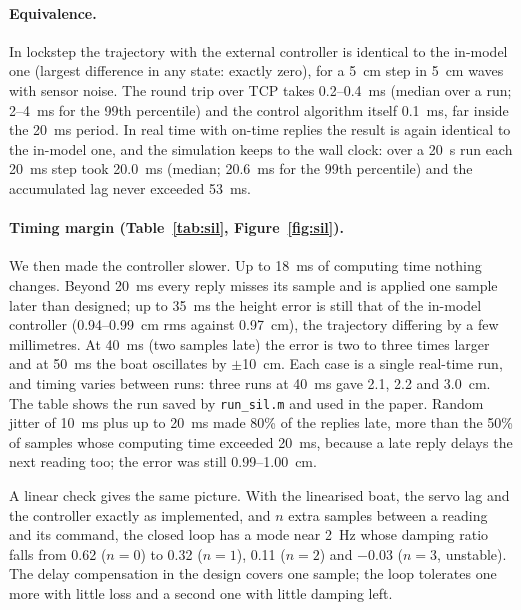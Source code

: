 \documentclass[11pt,a4paper]{article}
\begin{document}
\paragraph{Equivalence.} In lockstep the trajectory with the external controller
is identical to the in-model one (largest difference in any state: exactly
zero), for a \SI{5}{cm} step in \SI{5}{cm} waves with sensor noise. The round trip
over TCP takes 0.2--\SI{0.4}{ms} (median over a run; 2--\SI{4}{ms} for the 99th
percentile) and the
control algorithm itself \SI{0.1}{ms}, far inside the \SI{20}{ms} period. In real
time with on-time replies the result is again identical to the in-model one, and
the simulation keeps to the wall clock: over a \SI{20}{s} run each \SI{20}{ms}
step took \SI{20.0}{ms} (median; \SI{20.6}{ms} for the 99th percentile) and the
accumulated lag never exceeded \SI{53}{ms}.

\paragraph{Timing margin (Table~\ref{tab:sil}, Figure~\ref{fig:sil}).} We then
made the controller slower. Up to \SI{18}{ms} of computing time nothing changes.
Beyond \SI{20}{ms} every reply misses its sample and is applied one sample later
than designed; up to \SI{35}{ms} the height error is still that of the in-model
controller (0.94--\SI{0.99}{cm} rms against \SI{0.97}{cm}), the trajectory differing
by a few millimetres. At \SI{40}{ms} (two samples late) the error is two to three
times larger and at \SI{50}{ms} the boat oscillates by $\pm$\SI{10}{cm}. Each
case is a single real-time run, and timing varies between runs: three runs at
\SI{40}{ms} gave 2.1, 2.2 and \SI{3.0}{cm}. The table shows the run saved by
\texttt{run\_sil.m} and used in the paper. Random jitter of
\SI{10}{ms} plus up to \SI{20}{ms} made 80\% of the replies late, more than the
50\% of samples whose computing time exceeded \SI{20}{ms}, because a late reply
delays the next reading too; the error was still 0.99--\SI{1.00}{cm}.

A linear check gives the same picture. With the linearised boat, the servo lag
and the controller exactly as implemented, and $n$ extra samples between a
reading and its command, the closed loop has a mode near \SI{2}{Hz} whose
damping ratio falls from 0.62 ($n=0$) to 0.32 ($n=1$), 0.11 ($n=2$) and
$-0.03$ ($n=3$, unstable). The delay compensation in the design covers one
sample; the loop tolerates one more with little loss and a second one with
little damping left.
\end{document}
